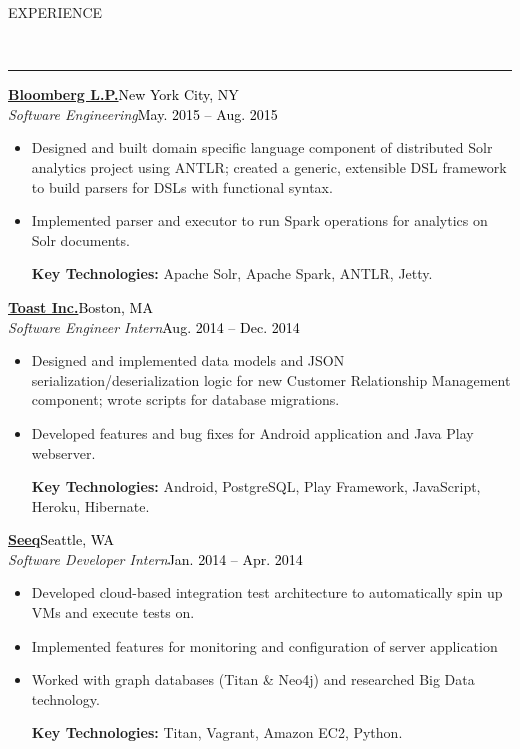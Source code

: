 \documentclass[11pt, letterpaper, oneside]{article}
\newcommand{\HRule}[2]{\textcolor{#1}{\rule{\linewidth}{#2}}}
\newcommand{\sectiontitle}[1]{\begin{minipage}{\textwidth}\vspace{-7.5pt}\begin{flushleft}\hspace{-20.5pt}\vspace{-25pt}
\Large\MakeUppercase{#1}\end{flushleft}\end{minipage}\\\HRule{black}{0.15mm}\vspace{\baselineskip}}
\newenvironment{ressection}[1]{
  \sectiontitle{#1}}
  {\vspace{-\baselineskip}}
\newcommand{\resentryheader}[4]{
    \vspace{-6pt}
    \textbf{#1}\hspace{\stretch{1}}\textcolor{black}{#3}\\
    \textit{#2}\hspace{\stretch{1}}\textcolor{black}{#4}\\
}
\newcommand{\resitem}[1]{
    \vspace{2pt}
    \item \begin{flushleft} #1 \end{flushleft}
}
\newenvironment{resentry}[4]{
  \begin{minipage}{\textwidth}
  \vspace{-3pt}
    \resentryheader{#1}{#2}{#3}{#4}
        \vspace{-\baselineskip}
    \begin{itemize}[noitemsep,nolistsep]
}{
    \end{itemize}
        \vspace{\baselineskip}
        \end{minipage}
}
\begin{document}
\begin{ressection}{Experience}
  \begin{resentry}{\href{http://www.bloomberg.com/professional/}{Bloomberg L.P.}}{Software Engineering}{New York City, NY}{May. 2015 -- Aug. 2015}
    \resitem{Designed and built domain specific language component of distributed Solr analytics project using ANTLR; created a generic, extensible DSL framework to build parsers for DSLs with functional syntax.}
    \resitem{Implemented parser and executor to run Spark operations for analytics on Solr documents.}
    \vspace{3pt} \hspace{-15pt}
    \textbf{Key Technologies:} Apache Solr, Apache Spark, ANTLR, Jetty.
    \vspace{6pt} 
  \end{resentry}  
  \begin{resentry}{\href{http://pos.toasttab.com/}{Toast Inc.}}{Software Engineer Intern}{Boston, MA}{Aug. 2014 -- Dec. 2014}
   \resitem{Designed and implemented data models and JSON serialization/deserialization logic for new Customer Relationship Management component; wrote scripts for database migrations. }
    \resitem{Developed features and bug fixes for Android application and Java Play webserver.}
    \vspace{3pt}  \hspace{-15pt}
    \textbf{Key Technologies:} Android, PostgreSQL, Play Framework, JavaScript, Heroku, Hibernate.
	\vspace{6pt}   
  \end{resentry}  
  \begin{resentry}{\href{http://www.seeq.com/}{Seeq}}{Software Developer Intern}{Seattle, WA}{Jan. 2014 -- Apr. 2014}
    \resitem{Developed cloud-based integration test architecture to automatically spin up VMs and execute tests on.}
    \resitem{Implemented features for monitoring and configuration of server application}
    \resitem{Worked with graph databases (Titan \& Neo4j) and researched Big Data technology.}
    \vspace{3pt} \hspace{-15pt}
    \textbf{Key Technologies:} Titan, Vagrant, Amazon EC2, Python.
	\vspace{6pt}   
  \end{resentry}
\end{ressection}

\vspace{4pt}
\end{document}
